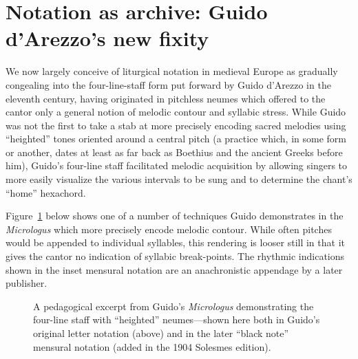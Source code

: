     \section{Notation as archive: Guido d'Arezzo's new fixity}

    We now largely conceive of liturgical notation in medieval Europe as gradually congealing into the four-line-staff form put forward by Guido d'Arezzo in the eleventh century, having originated in pitchless neumes which offered to the cantor only a general notion of melodic contour and syllabic stress.\autocite[16]{Taruskin_2009} While Guido was not the first to take a stab at more precisely encoding sacred melodies using ``heighted'' tones oriented around a central pitch (a practice which, in some form or another, dates at least as far back as Boethius and the ancient Greeks before him\autocite[17]{Taruskin_2009}), Guido's four-line staff facilitated melodic acquisition by allowing singers to more easily visualize the various intervals to be sung and to determine the chant's ``home'' hexachord.\autocite[53]{Reisenweaver_2012}

    Figure~\ref{fig:guidonew} below shows one of a number of techniques Guido demonstrates in the \textit{Micrologus} which more precisely encode melodic contour. While often pitches would be appended to individual syllables, this rendering is looser still in that it gives the cantor no indication of syllabic break-points. The rhythmic indications shown in the inset mensural notation are an anachronistic appendage by a later publisher.

        \begin{figure}
            \centering
            \captionsetup{width=.5\linewidth}
            \caption[A pedagogical excerpt from Guido's \textit{Micrologus} demonstrating the four-line staff with ``heighted'' neumes---shown here both in Guido's original letter notation (above) and in the later ``black note'' mensural notation (added in the 1904 Solesmes edition).]{A pedagogical excerpt from Guido's \textit{Micrologus} demonstrating the four-line staff with ``heighted'' neumes---shown here both in Guido's original letter notation (above) and in the later ``black note'' mensural notation (added in the 1904 Solesmes edition).\footnotemark}
            \label{fig:guidonew}
        \end{figure}

